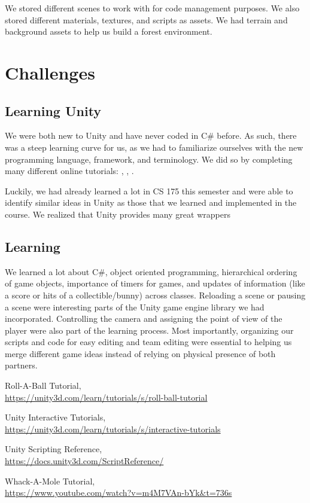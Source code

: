 \documentclass[12pt]{article}
\begin{document}
  We stored different scenes to work with for code management purposes. We also stored different materials, textures, and scripts as assets. We had terrain and background assets to help us build a forest environment. 

\section{Challenges}
\subsection{Learning Unity}
We were both new to Unity and have never coded in C\# before. As such, there was a steep learning curve for us, as we had to familiarize ourselves with the new programming language, framework, and terminology. We did so by completing many different online tutorials: \cite{tutorial-rab}, \cite{tutorial1}, \cite{tutorial-wam}.

Luckily, we had already learned a lot in CS 175 this semester and were able to identify similar ideas in Unity as those that we learned and implemented in the course. We realized that Unity provides many great wrappers

\subsection{Learning } 
We learned a lot about C#, object oriented programming, hierarchical ordering of game objects, importance of timers for games, and updates of information (like a score or hits of a collectible/bunny) across classes. Reloading a scene or pausing a scene were interesting parts of the Unity game engine library we had incorporated. Controlling the camera and assigning the point of view of the player were also part of the learning process. 
Most importantly, organizing our scripts and code for easy editing and team editing were essential to helping us merge different game ideas instead of relying on physical presence of both partners. 

\begin{thebibliography}{999}

    Roll-A-Ball Tutorial, \\
    \url{https://unity3d.com/learn/tutorials/s/roll-ball-tutorial}

    Unity Interactive Tutorials, \\
    \url{https://unity3d.com/learn/tutorials/s/interactive-tutorials}

    Unity Scripting Reference, \\
    \url{https://docs.unity3d.com/ScriptReference/}

    Whack-A-Mole Tutorial, \\
    \url{https://www.youtube.com/watch?v=m4M7VAn-bYk&t=736s}

  \end{thebibliography}
\end{document}
